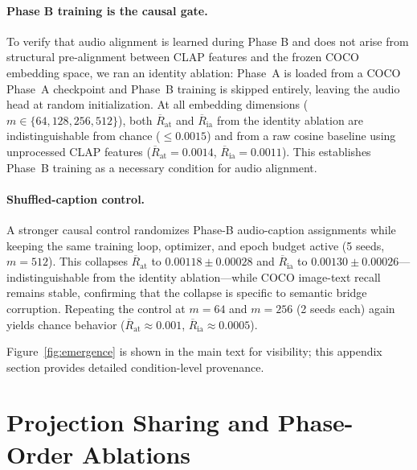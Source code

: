 \documentclass{article}
\newcommand{\avgR}{\overline{R}}
\begin{document}
\paragraph{Phase B training is the causal gate.}
To verify that audio alignment is learned during Phase B and does not arise from structural pre-alignment between CLAP features and the frozen COCO embedding space, we ran an identity ablation: Phase~A is loaded from a COCO Phase~A checkpoint and Phase~B training is skipped entirely, leaving the audio head at random initialization.
At all embedding dimensions ($m \in \{64, 128, 256, 512\}$), both $\avgR_\mathrm{at}$ and $\avgR_\mathrm{ia}$ from the identity ablation are indistinguishable from chance ($\leq 0.0015$) and from a raw cosine baseline using unprocessed CLAP features ($\avgR_\mathrm{at} = 0.0014$, $\avgR_\mathrm{ia} = 0.0011$).
This establishes Phase~B training as a necessary condition for audio alignment.

\paragraph{Shuffled-caption control.}
A stronger causal control randomizes Phase-B audio-caption assignments while keeping the same training loop, optimizer, and epoch budget active (5 seeds, $m=512$).
This collapses $\avgR_\mathrm{at}$ to $0.00118 \pm 0.00028$ and $\avgR_\mathrm{ia}$ to $0.00130 \pm 0.00026$---indistinguishable from the identity ablation---while COCO image-text recall remains stable, confirming that the collapse is specific to semantic bridge corruption.
Repeating the control at $m=64$ and $m=256$ (2 seeds each) again yields chance behavior ($\avgR_\mathrm{at}\approx 0.001$, $\avgR_\mathrm{ia}\approx 0.0005$).

Figure~\ref{fig:emergence} is shown in the main text for visibility; this appendix section provides detailed condition-level provenance.

\section{Projection Sharing and Phase-Order Ablations}
\label{app:sharing_phase}
\label{sec:sharing}
\end{document}
